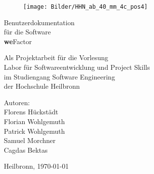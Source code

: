 %
%

\thispagestyle{empty}

\begin{figure}
\flushright						%
\texttt{[image: Bilder/HHN\_ab\_40\_mm\_4c\_pos4]}\\
\end{figure}

\vspace*{1.0cm}

\begin{center}
{\Huge Benutzerdokumentation\\
\vspace{0.1cm} 
für die Software\\
\vspace{0.1cm} 
\textbf{we}Factor}

\vspace{3.0cm}

	{\Large Als Projektarbeit für die Vorlesung\\
\vspace{0.1cm}
	Labor für Softwareentwicklung und Project Skills\\
\vspace{0.1cm}
	im Studiengang Software Engineering\\
\vspace{0.1cm}
	der Hochschule Heilbronn\\

}
\end{center}

\vspace*{3.0cm}


{\Large


Autoren:\\Florens Hückstädt\\
			Florian Wohlgemuth\\
			Patrick Wohlgemuth\\
			Samuel Morchner\\
			Cagdas Bektas

 }
\vspace{1,5cm}
Heilbronn, \today
